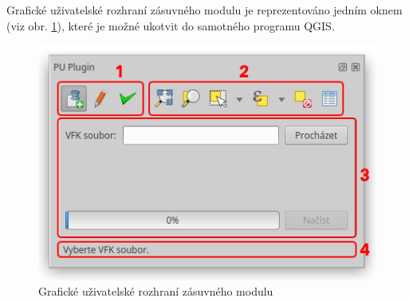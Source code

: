 Grafické uživatelské rozhraní zásuvného modulu je reprezentováno jedním oknem (viz obr. \ref{fig:main_gui}), které je možné ukotvit do samotného programu QGIS.

	\begin{figure}[H]
		\centering
		\includegraphics[width=.55\textwidth]{./pictures/main_gui.png}
		\caption[Grafické uživatelské rozhraní zásuvného modulu]{Grafické uživatelské rozhraní zásuvného modulu}
		\label{fig:main_gui}
 	\end{figure}

